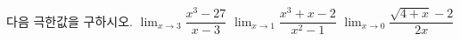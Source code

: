 다음 극한값을 구하시오.
 $\displaystyle\lim_{x\to 3}\dfrac{x^3-27}{x-3}$
 $\displaystyle\lim_{x\to 1}\dfrac{x^3+x-2}{x^2-1}$
 $\displaystyle\lim_{x\to 0}\dfrac{\sqrt{4+x}-2}{2x}$
